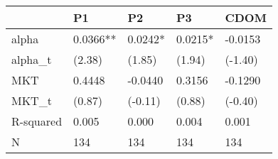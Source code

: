 \begin{tabular}{lllll}
\toprule
 & P1 & P2 & P3 & CDOM \\
\midrule
alpha & 0.0366** & 0.0242* & 0.0215* & -0.0153 \\
alpha_t & (2.38) & (1.85) & (1.94) & (-1.40) \\
MKT & 0.4448 & -0.0440 & 0.3156 & -0.1290 \\
MKT_t & (0.87) & (-0.11) & (0.88) & (-0.40) \\
R-squared & 0.005 & 0.000 & 0.004 & 0.001 \\
N & 134 & 134 & 134 & 134 \\
\bottomrule
\end{tabular}
